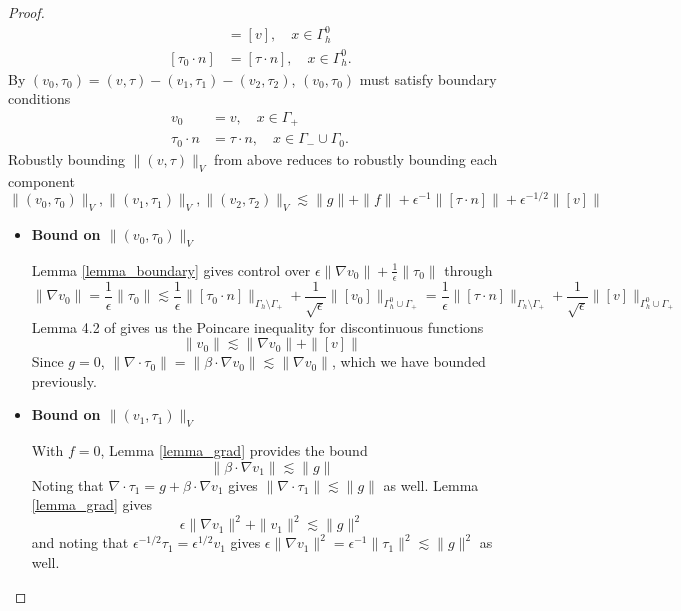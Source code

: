 \documentclass[11pt,onecolumn]{scrartcl}
\newcommand{\grad}{\nabla}
\renewcommand{\div}{\grad \cdot}
\begin{document}
\begin{proof}
\begin{align*}
[v_0] &= [v], \quad x\in \Gamma_h^0\\
[\tau_0 \cdot n] &= [\tau \cdot n], \quad x\in \Gamma_h^0.
\end{align*}
By $\left(v_0,\tau_0\right) = \left(v,\tau\right) - \left(v_1,\tau_1\right) - \left(v_2,\tau_2\right)$, $\left(v_0,\tau_0\right)$ must satisfy boundary conditions
\begin{align*}
v_0 &= v, \quad x\in \Gamma_+\\
\tau_0 \cdot n &= \tau \cdot n, \quad x\in \Gamma_-\cup \Gamma_0.
\end{align*}
Robustly bounding $\|\left(v,\tau\right)\|_V$ from above reduces to robustly bounding each component 
\[
\|\left(v_{0},\tau_{0}\right)\|_V, \|\left(v_{1},\tau_{1}\right)\|_V, \|\left(v_{2},\tau_{2}\right)\|_V \lesssim \|g\| + \|f\| + \epsilon^{-1}\|[\tau\cdot n]\| + \epsilon^{-1/2}\|[v]\|
\]
\begin{itemize}
\item \textbf{Bound on $\|\left(v_{0},\tau_{0}\right)\|_V$}
 
Lemma \ref{lemma_boundary} gives control over $\epsilon\|\grad v_0\| + \frac{1}{\epsilon}\|\tau_0\|$ through
\[
\|\grad v_0\| = \frac{1}{\epsilon}\|\tau_0\| \lesssim \frac{1}{\epsilon} \| [\tau_0\cdot n]\|_{\Gamma_h \setminus \Gamma_+} + \frac{1}{\sqrt{\epsilon}} \| [v_0]\|_{\Gamma_h^0 \cup \Gamma_+} = \frac{1}{\epsilon} \| [\tau\cdot n]\|_{\Gamma_h \setminus \Gamma_+} + \frac{1}{\sqrt{\epsilon}} \| [v]\|_{\Gamma_h^0 \cup \Gamma_+}
\]
Lemma 4.2 of \cite{analysisDPG} gives us the Poincare inequality for discontinuous functions
\[
\|v_0\| \lesssim \|\grad v_0\| + \|[v]\|
\]
Since $g = 0$, $\| \div \tau_0\| = \|\beta\cdot \grad v_0\|\lesssim \|\grad v_0\|$, which we have bounded previously.  

\item \textbf{Bound on $\|\left(v_{1},\tau_{1}\right)\|_V$}

With $f = 0$, Lemma \ref{lemma_grad} provides the bound
\[
\|\beta \cdot \grad v_1 \| \lesssim \| g\|
\]
Noting that $\div \tau_1 = g+\beta\cdot \grad v_1$ gives $\|\div \tau_1 \| \lesssim \|g\|$ as well.  Lemma \ref{lemma_grad} gives
\[
\epsilon \|\grad v_1\|^2 + \|v_1\|^2 \lesssim \|g\|^2
\]
and noting that $\epsilon^{-1/2}\tau_1 = \epsilon^{1/2}v_1$ gives $\epsilon\|\grad v_1\|^2 = \epsilon^{-1}\|\tau_1\|^2 \lesssim \|g\|^2$ as well.


\end{itemize}
\end{proof}
\end{document}

